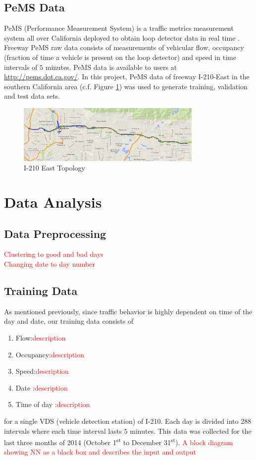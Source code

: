 \documentclass[11pt]{article}
\begin{document}
\subsection{PeMS Data} 
PeMS (Performance Measurement System) is a traffic metrics measurement system all over California deployed to obtain loop detector data in real time \cite{PemsPravin}. Freeway PeMS raw data consists of measurements of vehicular flow, occupancy (fraction of time a vehicle is present on the loop detector) and speed in time intervals of $5$ minutes. PeMS data is available to users at \url{http://pems.dot.ca.gov/}. In this project, PeMS data of freeway I-210-East in the southern California area (c.f. Figure \ref{fig:210})  was used to generate training, validation and test data sets. 
\begin{figure}[H]
    \centering
    \includegraphics[width=0.8\textwidth]{210.png}
    \caption{I-210 East Topology}
    \label{fig:210}
\end{figure} 


\section{Data Analysis}
\subsection{Data Preprocessing}
\textcolor{red}{Clustering to good and bad days\\
Changing date to day number\\}
\subsection{Training Data}
As mentioned previously, since traffic behavior is highly dependent on time of the day and date, our training data consists of 
\begin{enumerate}
\item Flow:\textcolor{red}{description}
\item Occupancy:\textcolor{red}{description}
\item Speed:\textcolor{red}{description}
\item Date :\textcolor{red}{description}
\item Time of day :\textcolor{red}{description}
\end{enumerate}for a single VDS (vehicle detection station) of I-210. Each day is divided into 288 intervals where each time interval lasts $5$ minutes. This data was collected for the last three months of 2014 (October 1\textsuperscript{st} to December 31\textsuperscript{st}).
\textcolor{red}{A block diagram showing NN as a black box and describes the input and output}
\end{document}
